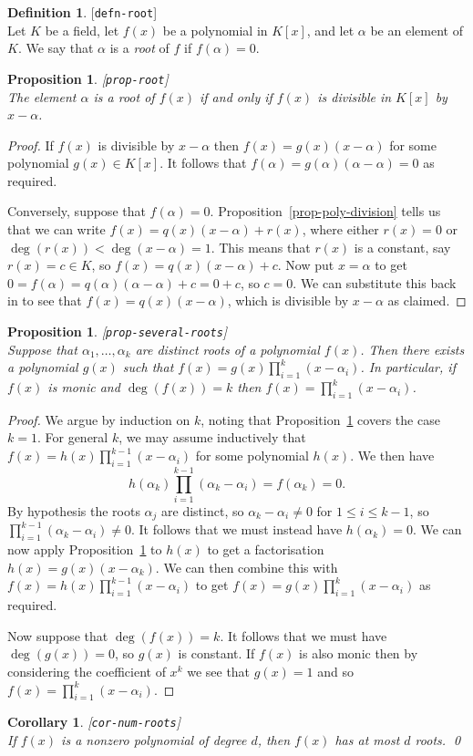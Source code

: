\documentclass{amsart}
\newcommand{\lbl}[1]{\label{#1}\textup{[\texttt{#1}]}\ \\}
\newcommand{\lbl}{\label}
\newcommand{\al}        {\alpha}
\renewcommand{\:}{\colon}
\newtheorem{proposition}[theorem]{Proposition}
\newtheorem{corollary}[theorem]{Corollary}
\theoremstyle{definition}
\newtheorem{definition}[theorem]{Definition}
\begin{document}
\begin{definition}\lbl{defn-root}
 Let $K$ be a field, let $f(x)$ be a polynomial in $K[x]$, and let
 $\al$ be an element of $K$.  We say that $\al$ is a \emph{root} of
 $f$ if $f(\al)=0$.
\end{definition}

\begin{proposition}\lbl{prop-root}
 The element $\al$ is a root of $f(x)$ if and only if $f(x)$ is
 divisible in $K[x]$ by $x-\al$.
\end{proposition}
\begin{proof}
 If $f(x)$ is divisible by $x-\al$ then $f(x)=g(x)(x-\al)$ for some
 polynomial $g(x)\in K[x]$.  It follows that
 $f(\al)=g(\al)(\al-\al)=0$ as required.

 Conversely, suppose that $f(\al)=0$.
 Proposition~\ref{prop-poly-division} tells us that we can write
 $f(x)=q(x)(x-\al)+r(x)$, where either $r(x)=0$ or
 $\deg(r(x))<\deg(x-\al)=1$.  This means that $r(x)$ is a constant,
 say $r(x)=c\in K$, so $f(x)=q(x)(x-\al)+c$.  Now put $x=\al$ to get
 $0=f(\al)=q(\al)(\al-\al)+c=0+c$, so $c=0$.  We can substitute this
 back in to see that $f(x)=q(x)(x-\al)$, which is divisible by $x-\al$
 as claimed.
\end{proof}

\begin{proposition}\lbl{prop-several-roots}
 Suppose that $\al_1,\dotsc,\al_k$ are distinct roots of a polynomial
 $f(x)$.  Then there exists a polynomial $g(x)$ such that
 $f(x)=g(x)\prod_{i=1}^k(x-\al_i)$.   In particular, if $f(x)$ is
 monic and $\deg(f(x))=k$ then $f(x)=\prod_{i=1}^k(x-\al_i)$.
\end{proposition}
\begin{proof}
 We argue by induction on $k$, noting that Proposition~\ref{prop-root}
 covers the case $k=1$.  For general $k$, we may assume inductively
 that $f(x)=h(x)\prod_{i=1}^{k-1}(x-\al_i)$ for some polynomial
 $h(x)$.  We then have 
 \[ h(\al_k)\prod_{i=1}^{k-1}(\al_k-\al_i)= f(\al_k) = 0. \]
 By hypothesis the roots $\al_j$ are distinct, so $\al_k-\al_i\neq 0$
 for $1\leq i\leq k-1$, so $\prod_{i=1}^{k-1}(\al_k-\al_i)\neq 0$.  It
 follows that we must instead have $h(\al_k)=0$.  We can now apply
 Proposition~\ref{prop-root} to $h(x)$ to get a factorisation
 $h(x)=g(x)(x-\al_k)$.  We can then combine this with 
 $f(x)=h(x)\prod_{i=1}^{k-1}(x-\al_i)$ to get 
 $f(x)=g(x)\prod_{i=1}^k(x-\al_i)$ as required.

 Now suppose that $\deg(f(x))=k$.  It follows that we must have
 $\deg(g(x))=0$, so $g(x)$ is constant.  If $f(x)$ is also monic then
 by considering the coefficient of $x^k$ we see that $g(x)=1$ and so
 $f(x)=\prod_{i=1}^k(x-\al_i)$.
\end{proof}
\begin{corollary}\lbl{cor-num-roots}
 If $f(x)$ is a nonzero polynomial of degree $d$, then $f(x)$ has at
 most $d$ roots. \qed
\end{corollary}
\end{document}
